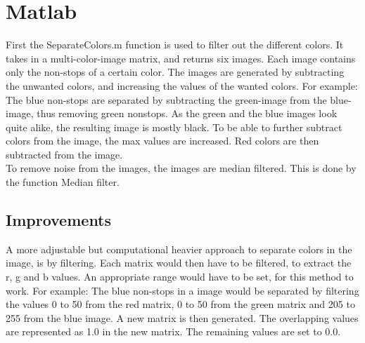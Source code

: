 \lstset{language=Matlab}
\lstset{frame=single}
\section{Matlab}
First the SeparateColors.m function is used to filter out the different colors. It takes in a multi-color-image matrix, and returns six images. Each image contains only the non-stops of a certain color. The images are generated by subtracting the unwanted colors, and increasing the values of the wanted colors.
For example: The blue non-stops are separated by subtracting the green-image from the blue-image, thus removing green nonstops. As the green and the blue images look quite alike, the resulting image is mostly black. To be able to further subtract colors from the image, the max values are increased. Red colors are then subtracted from the image. \\
 

To remove noise from the images, the images are median filtered. This is done by the function Median filter. 

\subsection{Improvements}
A more adjustable but computational heavier approach to separate colors in the image, is by filtering. Each matrix would then have to be filtered, to extract the r, g and b values. An appropriate range would have to be set, for this method to work. For example: The blue non-stops in a image would be separated by filtering the values 0 to 50 from the red matrix, 0 to 50 from the green matrix and 205 to 255 from the blue image. A new matrix is then generated. The overlapping values are represented as 1.0 in the new matrix. The remaining values are set to 0.0. \\



